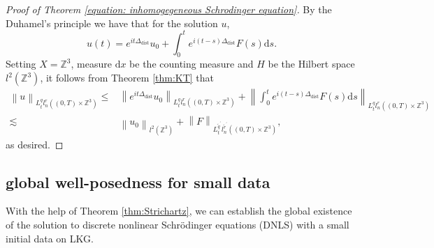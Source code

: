 \documentclass[12pt]{amsart}
\newcommand\norm[1]{\left\|#1\right\|}
\newcommand{\Z}{\mathbb{Z}}
\def\d{\mathrm{d}}
\begin{document}
	\begin{proof}[Proof of Theorem \ref{equation: inhomogegeneous Schrodinger equation}]
		By the Duhamel's principle we have that for the solution $u$, 
		\begin{equation*}
			u\left(t\right)=e^{it\Delta_{\mathrm{dist}}}u_{0}+\int_{0}^{t}e^{i\left(t-s\right)\Delta_{\mathrm{dist}}}F\left(s\right)\d s.
		\end{equation*}
		Setting $X=\Z^{3}$, measure $\d x$ be the counting measure and $H$ be the Hilbert space $l^{2}\left(\Z^{3}\right)$, it follows from Theorem \ref{thm:KT} that\begin{equation*}
			\begin{aligned}
				\norm{u}_{L^{q}_{t}l^{r}_{n}\left(\left(0,T\right)\times\Z^{3}\right)}\leq&\norm{e^{it\Delta_{\mathrm{dist}}}u_{0}}_{L^{q}_{t}l^{r}_{n}\left(\left(0,T\right)\times\Z^{3}\right)}+\norm{\int_{0}^{t}e^{i\left(t-s\right)\Delta_{\mathrm{dist}}}F\left(s\right)\d s}_{L^{q}_{t}l^{r}_{n}\left(\left(0,T\right)\times\Z^{3}\right)}\\
				\lesssim&\norm{u_{0}}_{l^{2}\left(\Z^{3}\right)}+\norm{F}_{L^{\tilde{q}^{\prime}}_{t}l^{\tilde{r}^{\prime}}_{n}\left(\left(0,T\right)\times\Z^{3}\right)},
			\end{aligned}
		\end{equation*}
		as desired.
	\end{proof}
	

	
	\subsection{global well-posedness for small data}\label{subsec3.2}
	
	With the help of Theorem \ref{thm:Strichartz}, we can establish the global existence of the solution to discrete nonlinear Schr\"odinger equations (DNLS) with a small initial data on LKG.
\end{document}
